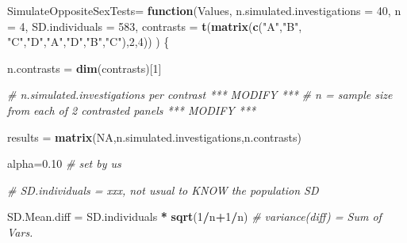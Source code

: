 \documentclass[]{book}
\newenvironment{Shaded}{\begin{snugshade}}{\end{snugshade}}
\newcommand{\CommentTok}[1]{\textcolor[rgb]{0.56,0.35,0.01}{\textit{#1}}}
\newcommand{\ControlFlowTok}[1]{\textcolor[rgb]{0.13,0.29,0.53}{\textbf{#1}}}
\newcommand{\DataTypeTok}[1]{\textcolor[rgb]{0.13,0.29,0.53}{#1}}
\newcommand{\DecValTok}[1]{\textcolor[rgb]{0.00,0.00,0.81}{#1}}
\newcommand{\FloatTok}[1]{\textcolor[rgb]{0.00,0.00,0.81}{#1}}
\newcommand{\KeywordTok}[1]{\textcolor[rgb]{0.13,0.29,0.53}{\textbf{#1}}}
\newcommand{\NormalTok}[1]{#1}
\newcommand{\OperatorTok}[1]{\textcolor[rgb]{0.81,0.36,0.00}{\textbf{#1}}}
\newcommand{\OtherTok}[1]{\textcolor[rgb]{0.56,0.35,0.01}{#1}}
\newcommand{\StringTok}[1]{\textcolor[rgb]{0.31,0.60,0.02}{#1}}
\begin{document}
\begin{Shaded}
\begin{Highlighting}[]
\NormalTok{SimulateOppositeSexTests=}\StringTok{ }\ControlFlowTok{function}\NormalTok{(Values,}
        \DataTypeTok{n.simulated.investigations =} \DecValTok{40}\NormalTok{, }
        \DataTypeTok{n =} \DecValTok{4}\NormalTok{,}
        \DataTypeTok{SD.individuals =} \DecValTok{583}\NormalTok{,}
        \DataTypeTok{contrasts =} 
          \KeywordTok{t}\NormalTok{(}\KeywordTok{matrix}\NormalTok{(}\KeywordTok{c}\NormalTok{(}\StringTok{"A"}\NormalTok{,}\StringTok{"B"}\NormalTok{, }\StringTok{"C"}\NormalTok{,}\StringTok{"D"}\NormalTok{,}\StringTok{"A"}\NormalTok{,}\StringTok{"D"}\NormalTok{,}\StringTok{"B"}\NormalTok{,}\StringTok{"C"}\NormalTok{),}\DecValTok{2}\NormalTok{,}\DecValTok{4}\NormalTok{)) ) \{}
  
\NormalTok{   n.contrasts =}\StringTok{ }\KeywordTok{dim}\NormalTok{(contrasts)[}\DecValTok{1}\NormalTok{]}

   \CommentTok{# n.simulated.investigations   per contrast  *** MODIFY ***}
   \CommentTok{# n =  sample size from each of 2 contrasted panels *** MODIFY ***}

\NormalTok{   results =}\StringTok{ }\KeywordTok{matrix}\NormalTok{(}\OtherTok{NA}\NormalTok{,n.simulated.investigations,n.contrasts)}
        
\NormalTok{   alpha=}\FloatTok{0.10} \CommentTok{# set by us}

   \CommentTok{# SD.individuals = xxx,  not usual to KNOW the population SD}

\NormalTok{   SD.Mean.diff =}\StringTok{ }\NormalTok{SD.individuals }\OperatorTok{*}\StringTok{ }\KeywordTok{sqrt}\NormalTok{(}\DecValTok{1}\OperatorTok{/}\NormalTok{n}\OperatorTok{+}\DecValTok{1}\OperatorTok{/}\NormalTok{n) }\CommentTok{# variance(diff) = Sum of Vars. }


\end{Highlighting}
\end{Shaded}
\end{document}
